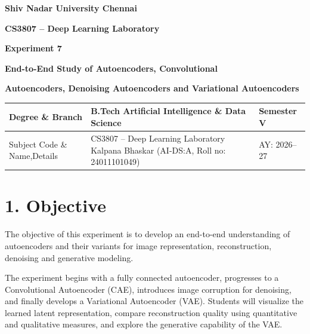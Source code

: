 \documentclass[10pt]{article}
\renewcommand{\arraystretch}{1.2}
\begin{document}

\begin{center}

{\large\textbf{Shiv Nadar University Chennai}}

\vspace{2mm}

{\normalsize\textbf{CS3807 -- Deep Learning Laboratory}}

\vspace{2mm}

{\large\textbf{Experiment 7}}

\vspace{1mm}

{\normalsize\textbf{End-to-End Study of Autoencoders, Convolutional}}

{\normalsize\textbf{Autoencoders, Denoising Autoencoders and Variational Autoencoders}}


\noindent
\renewcommand{\arraystretch}{1.25}

\begin{tabular}{|p{3cm}|p{8cm}|p{2cm}|}
\hline
Degree \& Branch & B.Tech Artificial Intelligence \& Data Science & Semester V\\ \hline
Subject Code \& Name,Details & CS3807 -- Deep Learning Laboratory \hspace{2 cm} Kalpana Bhaskar (AI-DS:A, Roll no: 24011101049) & AY: 2026--27\\ \hline
\end{tabular}
\end{center}
\section*{1. Objective}

The objective of this experiment is to develop an end-to-end understanding of
autoencoders and their variants for image representation, reconstruction,
denoising and generative modeling.

The experiment begins with a fully connected autoencoder, progresses to a
Convolutional Autoencoder (CAE), introduces image corruption for denoising,
and finally develops a Variational Autoencoder (VAE). Students will visualize
the learned latent representation, compare reconstruction quality using
quantitative and qualitative measures, and explore the generative capability
of the VAE.
\end{document}
